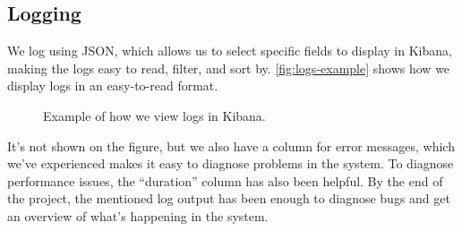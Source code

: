 \subsection{Logging}
\label{section:process-logging}
We log using JSON, which allows us to select specific fields to display in Kibana, making the logs easy to read, filter, and sort by. \autoref{fig:logs-example} shows how we display logs in an easy-to-read format.
\begin{figure}[H]
  \caption{Example of how we view logs in Kibana.}
  \label{fig:logs-example}
\end{figure}
It's not shown on the figure, but we also have a column for error messages, which we've experienced makes it easy to diagnose problems in the system. To diagnose performance issues, the ``duration'' column has also been helpful. By the end of the project, the mentioned log output has been enough to diagnose bugs and get an overview of what's happening in the system.
